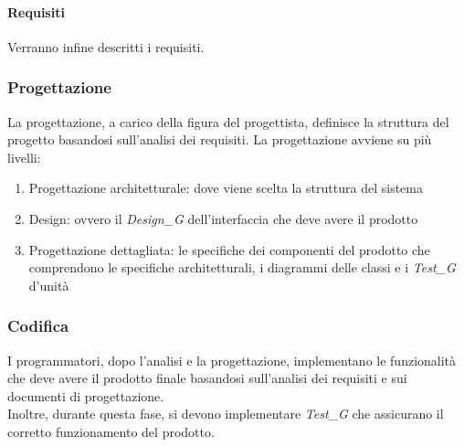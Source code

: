 \paragraph{Requisiti} 
Verranno infine descritti i requisiti.
\subsubsection{Progettazione}
La progettazione, a carico della figura del progettista, definisce la struttura del progetto basandosi sull'analisi dei requisiti.
La progettazione avviene su più livelli:
\begin{enumerate}
    \item Progettazione architetturale: dove viene scelta la struttura del sistema
    \item Design: ovvero il \textit{Design_G} dell'interfaccia che deve avere il prodotto
    \item Progettazione dettagliata: le specifiche dei componenti del prodotto che comprendono le specifiche architetturali, i diagrammi delle classi e i \textit{Test_G} d'unità
\end{enumerate}
\subsubsection{Codifica}
I programmatori, dopo l'analisi e la progettazione, implementano le funzionalità che deve avere il prodotto finale basandosi sull'analisi dei requisiti e sui documenti di progettazione.\\
Inoltre, durante questa fase, si devono implementare \textit{Test_G} che assicurano il corretto funzionamento del prodotto.